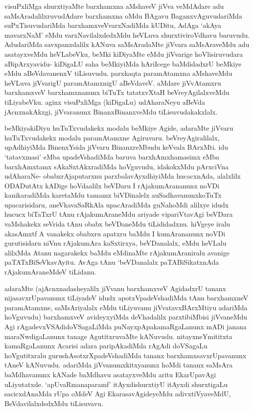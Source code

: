 \begin{artha}
visuPxliMga shurxtiyaMte barxhamxna aMshaveV jiVva veMdAdare adu
saMsAradalilxruvudAdare barxhamxna oMdu BAgavu BaganxvAguvudariMda
suPxTisuvudariMda barxhamxveVvarxNadiMda kUDitu, AdAga `akAya
mavarxNaM' eMdu varxNavilalxdedxMdu heVLuva shurxtiviroVdhavu
baruvudu. AdudariMda savxpanxdalilx kANuva saMsAradaMte jiVvara
saMsAraveMdu adu asatayxveMdu heVLabeVku, beMki kiDiyaMte eMdu
jiVvarige hoVlisiruvudara aBipArxyavidu- kiDigaLU saha beMkiyiMda
hAriIcege baMdidadxrU beMkiye eMdu aBeVdavanenxV tiLisuvudu. parxkaqta
paramAtamxna aMshaveMdu heVLuva jiVvarigU paramAtamxnigU
aBeVdaveV. aMdare jiVvAtamxru barxhamxveV barxhamxnanunx biTuTx
tatatxvXtaH beVreyAgilalxveMdu tiLiyabeVku. aginx visuPxliMga
(kiDigaLu) udAharaNeyu aBeVda jAcnxnakAkxgi, jiVvaranunx
BinanxBinanxveMdu tiLisuvudakakxlalx.
\end{artha}

\begin{artha}
beMkiyakiDiyu huTuTxvudakekx modalu beMkiye Agide, adaraMte jiVvaru
huTuTxvudakekx modalu paramAtamxne Agiruvaru. beVreyAgiralilalx,
upAdhiyiMda BinenxYsida jiVvaru BinanxreMbudu keVvala BArxMti. idu
`tatavxmasi' eMba upadeVshadiMda baruva barxhAmxhamasimx eMba
barxhAmxtamx sAkaSxtAkxradiMda hoVguvudu,  idakokxMdu pArxciVna
udAharaNe- obabxrAjaputarxnu parxbalavAyxdhiyiMda hucacxnAda,
alalxlilx ODADutAtx kADige hoVdaalilx beVDaru I rAjakumArananunx
noVDi kanikaradiMda karetaMdu tamamx biVDinalelx auSadhavanunxkoTuTx
upacarisidaru, aneVkavaSaRkAla upacAradiMda guNahoMdi alilxye idudx
hucucx biTaTxrU tAnu rAjakumAraneMdu ariyade vipariVtavAgi beVDara
vaMshakekx seVrida tAnu obabx beVDaneMdu tiLididadxnu. hiVgeye iralu
akasAmxtf A vanakekx obabxru apatxru baMdu I kumArananunx noVDi
gurutisidaru niVnu rAjakumAra  kaSxtirxya, beVDanalalx, eMdu
heVLalu alilxMda Atanu nagarakekx baMdu eMdinaMte rAjakumAraniralu
avanige paTATxBiSeVkavAyitu. AvAga tAnu `beVDanalalx paTABiSikatxnAda
rAjakumAraneMdeV tiLidanu.
\end{artha}

\begin{artha}
adaraMte (ajAcnxnadasheyalilx jiVvanu barxhamxveV AgidadxrU tananx
nijasavxrUpavanunx tiLiyadeV idudx apotxVpadeVshadiMda tAnu
barxhamxneV paramAtamxne, saMsAriyalalx eMdu tiLiyuvanu jiVvatavxBArxMtiyu
adariMda hoVguvudu) barxhamxveV avideyxyiMda deVhadalilx parxtibiMbisi
jiVvaneMdu Agi rAgadevxVSAdidoVSagaLiMda puNayxpApakamaRgaLanunx mADi
janana maraNwdigaLanunx tanage AgutitxruvaMte
kANuvudu. nitayxneYmititxta kamaRgaLanunx Acarisi adara paripAkadiMda
rAgAdi doVSagaLu hoVgutitxralu gurushAsotxrXpadeVshadiMda tananx
barxhamxsavxrUpavanunx tAneV kANuvudu. adariMda jiVvanumxkitxyanunx
hoMdi tananx saMsAra baMdhavanunx kANade baMdhavu asatayxveMdu aritu
EkarUpavAgi uLiyutatxde. `apUvaRmanaparamf' itAyxdishurxtiyU itAyxdi
shurxtigaLu sacicxdAnaMda rUpa oMdeV Agi EkarasavAgideyeMdu
adivxtiVyaveMdU, BeVdavilalxdedxMdu tiLisuvavu.
\end{artha}



